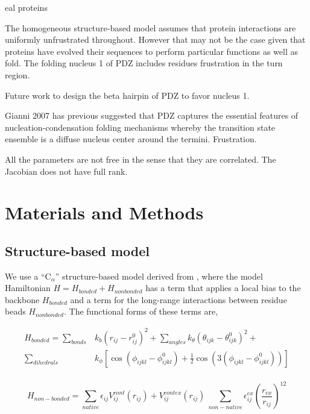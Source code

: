 \documentclass[preprint]{elsarticle}
\begin{document}
eal proteins 

The homogeneous structure-based model assumes that protein interactions are
uniformly unfrustrated throughout. However that may not be the case given that
proteins have evolved their sequences to perform particular functions as well
as fold. The folding nucleus 1 of PDZ includes residues frustration in the turn
region.

    Future work to design the beta hairpin of PDZ to favor nucleus 1.


    Gianni 2007 has previous suggested that PDZ captures the essential features
of nucleation-condensation folding mechanisms whereby the transition state
ensemble is a diffuse nucleus center around the termini. Frustration.

    All the parameters are not free in the sense that they are correlated. The
Jacobian does not have full rank.

\section{Materials and Methods}

\subsection{Structure-based model}
     
    We use a ``C$_{\alpha}$'' structure-based model derived from
\cite{Clementi2000}, where the model Hamiltonian $H = H_{bonded} +
H_{nonbonded}$ has a term that applies a local bias to the backbone
$H_{bonded}$ and a term for the long-range interactions between residue beads
$H_{nonbonded}$. The functional forms of these terms are,

\begin{align}
    H_{bonded} = \sum\limits_{bonds} &k_b (r_{ij} - r_{ij}^0)^2 + \sum\limits_{angles} k_{\theta} (\theta_{ijk} - \theta_{ijk}^0)^2 + \\
        \sum\limits_{dihedrals} &k_{\phi} [ \cos(\phi_{ijkl} - \phi_{ijkl}^0) + \frac{1}{2}\cos(3(\phi_{ijkl} - \phi_{ijkl}^0))] \\
\end{align}

\begin{equation}
    H_{non-bonded} = \sum\limits_{native} \epsilon_{ij}V^{cont}_{ij}(r_{ij}) + V^{cont ex}_{ij}(r_{ij}) \
        \sum\limits_{non-native} \epsilon^{ex}_{ij}\left(\frac{r_{ex}}{r_{ij}}\right)^{12}
\end{equation}
\end{document}
